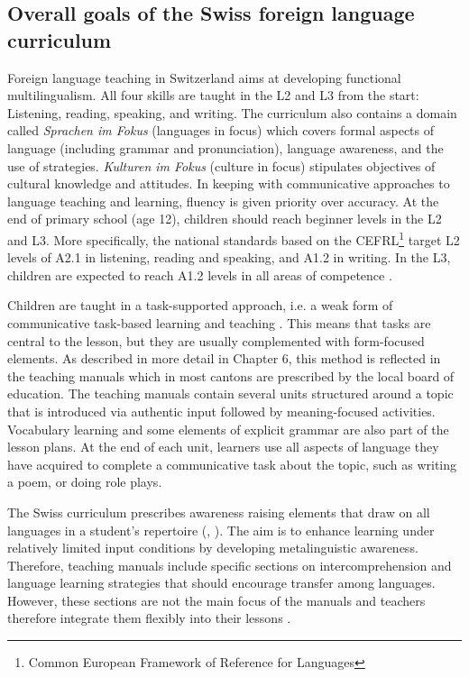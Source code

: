 \documentclass[output=paper]{langsci/langscibook}
\begin{document}
\subsection{Overall goals of the Swiss foreign language curriculum}
Foreign language teaching in Switzerland aims at developing functional multilingualism. All four skills are taught in the L2 and L3 from the start: Listening, reading, speaking, and writing. The curriculum also contains a domain called \textit{Sprachen im Fokus} (languages in focus) which covers formal aspects of language (including grammar and pronunciation), language awareness, and the use of strategies. \textit{Kulturen im Fokus} (culture in focus) stipulates objectives of cultural knowledge and attitudes. In keeping with communicative approaches to language teaching and learning, fluency is given priority over accuracy. At the end of primary school (age 12), children should reach beginner levels in the L2 and L3. More specifically, the national standards based on the CEFRL\footnote{Common European Framework of Reference for Languages} target L2 levels of A2.1 in listening, reading and speaking, and A1.2 in writing. In the L3, children are expected to reach A1.2 levels in all areas of competence \citep[17]{Zuerich2017}. 

Children are taught in a task-supported approach, i.e. a weak form of communicative task-based learning and teaching \citep{Ellis2017}. This means that tasks are central to the lesson, but they are usually complemented with form-focused elements. As described in more detail in Chapter 6, this method is reflected in the teaching manuals which in most cantons are prescribed by the local board of education. The teaching manuals contain several units structured around a topic that is introduced via authentic input followed by meaning-focused activities. Vocabulary learning and some elements of explicit grammar are also part of the lesson plans. At the end of each unit, learners use all aspects of language they have acquired to complete a communicative task about the topic, such as writing a poem, or doing role plays. 

The Swiss curriculum prescribes awareness raising elements that draw on all languages in a student’s repertoire (\citealt{EDK2004}, \citealt{Passepartout2008}). The aim is to enhance learning under relatively limited input conditions by developing metalinguistic awareness. Therefore, teaching manuals include specific sections on intercomprehension and language learning strategies that should encourage transfer among languages. However, these sections are not the main focus of the manuals and teachers therefore integrate them flexibly into their lessons \citep[8]{Zuerich2017}. 
\end{document}
